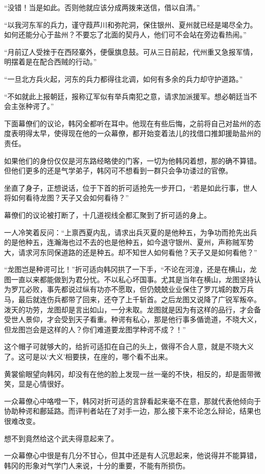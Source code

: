 “没错！当是如此。否则他就应该分成两拨来送信，借以自清。”

“以我河东军的兵力，谨守葭芦川和弥陀洞，保住银州、夏州就已经是竭尽全力。如何还能分心于盐州？不要忘了北面的契丹人，他们可不会站在旁边看热闹。”

“月前辽人受挫于在西陉寨外，便偃旗息鼓。可从三日前起，代州重又急报军情，明摆着是在配合西贼的行动。”

“一旦北方兵火起，河东的兵力都得往北调，如何有多余的兵力却守护道路。”

“不如就此上报朝廷，报称辽军似有举兵南犯之意，请求加派援军。想必朝廷当不会主张种谔了。”

下面幕僚们的议论，韩冈全都听在耳中。他现在有些后悔，之前将自己对盐州的态度表明得太早，使得现在他的一众幕僚，都开始变着法儿的找借口推卸援助盐州的责任。

如果他们的身份仅仅是河东路经略使的门客，一切为他韩冈着想，那的确不算错。但他们更多的还是气学弟子，韩冈可不想看到一群只会争功诿过的官僚。

坐直了身子，正想说话，位于下首的折可适抢先一步开口，“若是如此行事，世人将如何看待龙图？天子又会如何看待？”

幕僚们的议论被打断了，十几道视线全都汇聚到了折可适的身上。

一人冷笑着反问：“上禀西夏内乱，请求出兵灭夏的是他种五，为争功而抢先出兵的是他种五，连瀚海也过不去的也是他种五，如今退守银州、夏州，声称贼军势大，请求河东同保道路的还是种五。却不知世人如何看他？天子又是如何看他？”

“龙图岂是种谔可比！”折可适向韩冈拱了一下手，“不论在河湟，还是在横山，龙图一直以来都能做到为君分忧。不以私心坏国事。尤其是当年在横山，龙图坚持认为罗兀必败，事先都说过纵有功亦不愿取，但仍兢兢业业保住了罗兀城的数万兵马，最后就连伤兵都带了回来，还夺了上千斩首。之后龙图又说降了广锐军叛卒。泼天的功劳，龙图却是言出如山，一分未取。龙图就是因为有这样的品行，才会备受世人景仰，才会受到天子看重。种谔有私心，那是他行事多偱诡道，不晓大义，但龙图岂会是这样的人？你们难道要龙图学种谔不成？！”

这个帽子可就够大的，给折可适扣在自己的头上，做得不合人意，就是不晓大义了。这可是以‘大义’相要挟，在座的，哪个看不出来。

黄裳偷眼望向韩冈，却没有在他的脸上发现一丝一毫的不快，相反的，却是面带微笑，显是心情很好。

一众幕僚心中咯噔一下，韩冈对折可适的言辞看起来毫不在意，那就代表他倾向于协助种谔和鄜延路。而评判者站在了对手一边，那么接下来不论怎么辩论，结果也很难改变。

想不到竟然给这个武夫得意起来了。

一众幕僚心中很是有几分不甘心，但其中还是有人沉思起来，他说得并不能算错，韩冈的形象对气学门人来说，十分的重要，不能有所损伤。

